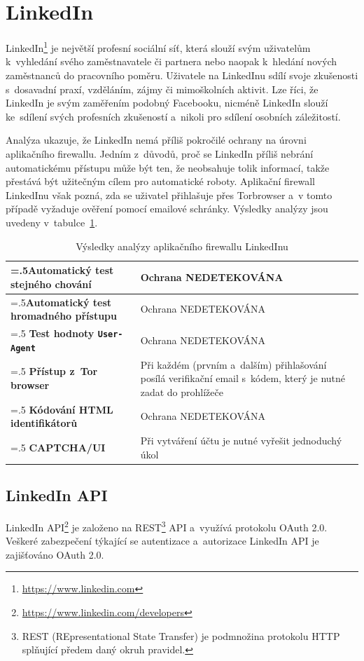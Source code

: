 \section{LinkedIn}
LinkedIn\footnote{\href{https://www.linkedin.com}{https://www.linkedin.com}} je největší profesní sociální síť, která slouží svým uživatelům k~vyhledání svého zaměstnavatele či partnera nebo naopak k~hledání nových zaměstnanců do pracovního poměru. Uživatele na LinkedInu sdílí svoje zkušenosti s~dosavadní praxí, vzděláním, zájmy či mimoškolních aktivit. Lze říci, že LinkedIn je svým zaměřením podobný Facebooku, nicméně LinkedIn slouží ke~sdílení svých profesních zkušeností a~nikoli pro sdílení osobních záležitostí. 

Analýza ukazuje, že LinkedIn nemá příliš pokročilé ochrany na úrovni aplikačního firewallu. Jedním z~důvodů, proč se LinkedIn příliš nebrání automatickému přístupu může být ten, že neobsahuje tolik  informací, takže přestává být užitečným cílem pro automatické roboty. Aplikační firewall LinkedInu však pozná, zda se uživatel přihlašuje přes Torbrowser a~v tomto případě vyžaduje ověření pomocí emailové schránky. Výsledky analýzy jsou uvedeny v~tabulce~\ref{tab:LinkedIn_analyse}.

\begin{table}[H]
\begin{tabularx}{\linewidth}{
  |>{\raggedright\arraybackslash\hsize=.5\hsize}X|>{\hsize=1.5\hsize}X|
  }
\hline

\textbf{Automatický test stejného chování} & Ochrana NEDETEKOVÁNA \\
\hline
\textbf{Automatický test hromadného přístupu} & Ochrana NEDETEKOVÁNA \\
\hline
\textbf{Test hodnoty \texttt{User-Agent}} & Ochrana NEDETEKOVÁNA \\
\hline
\textbf{Přístup z~Tor browser} & Při každém (prvním a~dalším) přihlašování posílá verifikační email s~kódem, který je nutné zadat do prohlížeče \\
\hline
\textbf{Kódování HTML identifikátorů} & Ochrana NEDETEKOVÁNA \\
\hline
\textbf{CAPTCHA/UI} & Při vytváření účtu je nutné vyřešit jednoduchý úkol \\
\hline
\end{tabularx}

\label{tab:LinkedIn_analyse}
\caption{Výsledky analýzy aplikačního firewallu LinkedInu}
\end{table}

\subsection*{LinkedIn API}
LinkedIn API\footnote{\href{https://www.linkedin.com/developers}{https://www.linkedin.com/developers}} je založeno na REST\footnote{REST (REpresentational State Transfer) je podmnožina protokolu HTTP splňující předem daný okruh pravidel.} API a~využívá protokolu OAuth 2.0. Veškeré zabezpečení týkající se autentizace a~autorizace LinkedIn API je zajišťováno OAuth 2.0.

